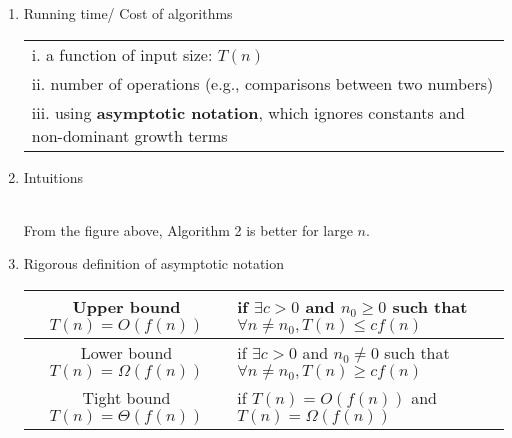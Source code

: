 \documentclass[11pt]{article}
\begin{document}
\begin{enumerate}
\item Running time/ Cost of algorithms\\
\begin{tabular}{l}
 i. a function of input size: $T(n)$\\
 ii. number of operations (e.g., comparisons between two numbers)\\
 iii. using \textbf{asymptotic notation}, which ignores constants and non-dominant growth terms
\end{tabular}

\item Intuitions\\
\\
From the figure above, Algorithm 2 is better for large $n$.\\

\item Rigorous definition of asymptotic notation\\
\begin{tabular}{|c|l|}
\hline
Upper bound $T(n) = O(f(n))$& if $\exists c > 0$ and $n_0 \geq 0$ such that $\forall n \neq n_0 , T(n) \leq c f(n)$\\
\hline
Lower bound $T(n) = \Omega(f(n))$& if $\exists c > 0$ and $n_0 \neq 0$ such that $\forall n \neq n_0 , T(n) \geq c f(n)$\\
\hline
Tight bound $T(n) = \Theta(f(n))$& if $T(n) = O(f(n))$ and $T(n) = \Omega(f(n))$\\
\hline
\end{tabular}


\end{enumerate}
\end{document}
